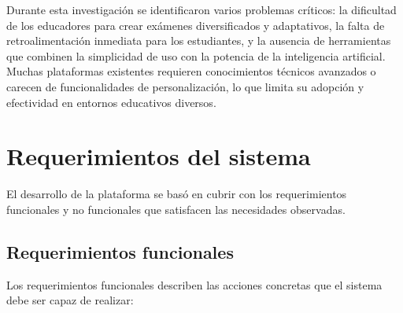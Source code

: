 \documentclass[12pt,a4paper]{report}
\begin{document}
Durante esta investigación se identificaron varios problemas críticos: la dificultad de los educadores para crear exámenes diversificados y adaptativos, la falta de retroalimentación inmediata para los estudiantes, y la ausencia de herramientas que combinen la simplicidad de uso con la potencia de la inteligencia artificial. Muchas plataformas existentes requieren conocimientos técnicos avanzados o carecen de funcionalidades de personalización, lo que limita su adopción y efectividad en entornos educativos diversos.

\section{Requerimientos del sistema}

El desarrollo de la plataforma se basó en cubrir con los requerimientos funcionales y no funcionales que satisfacen las necesidades observadas.

\subsection{Requerimientos funcionales}

Los requerimientos funcionales describen las acciones concretas que el sistema debe ser capaz de realizar:
\end{document}
